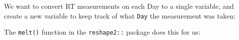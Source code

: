 \documentclass[]{article}
\newenvironment{Shaded}{\begin{snugshade}}{\end{snugshade}}
\newcommand{\KeywordTok}[1]{\textcolor[rgb]{0.13,0.29,0.53}{\textbf{#1}}}
\newcommand{\DataTypeTok}[1]{\textcolor[rgb]{0.13,0.29,0.53}{#1}}
\newcommand{\DecValTok}[1]{\textcolor[rgb]{0.00,0.00,0.81}{#1}}
\newcommand{\StringTok}[1]{\textcolor[rgb]{0.31,0.60,0.02}{#1}}
\newcommand{\OperatorTok}[1]{\textcolor[rgb]{0.81,0.36,0.00}{\textbf{#1}}}
\newcommand{\NormalTok}[1]{#1}
\theoremstyle{definition}
\theoremstyle{definition}
\theoremstyle{definition}
\theoremstyle{remark}
\begin{document}
We want to convert RT measurements on each Day to a single variable, and
create a new variable to keep track of what \texttt{Day} the measurement
was taken:

The \texttt{melt()} function in the \texttt{reshape2::} package does
this for us:

\begin{Shaded}
\end{Shaded}
\end{document}
